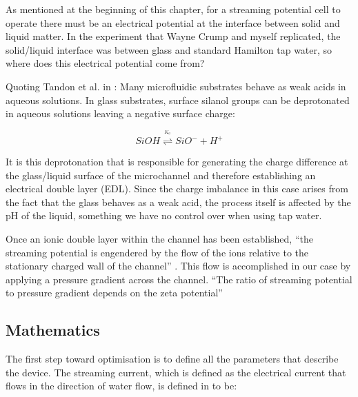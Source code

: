 As mentioned at the beginning of this chapter, for a streaming potential cell
to operate there must be an electrical potential at the interface between solid
and liquid matter. In the experiment that Wayne Crump and myself replicated,
the solid/liquid interface was between glass and standard Hamilton tap water,
so where does this electrical potential come from?

Quoting Tandon et al. in \cite{Tandon2008}: Many microfluidic substrates behave
as weak acids in aqueous solutions. In glass substrates, surface silanol groups
can be deprotonated in aqueous solutions leaving a negative surface charge:

\begin{equation}
    SiOH\overset{^{K_{a}}}{\mathbf{\rightleftharpoons}}SiO^{-}+H^{+}
\end{equation}


It is this deprotonation that is responsible for generating the charge
difference at the glass/liquid surface of the microchannel and therefore
establishing an electrical double layer (EDL). Since the charge imbalance in
this case arises from the fact that the glass behaves as a weak acid, the
process itself is affected by the pH of the liquid, something we have no
control over when using tap water.

Once an ionic double layer within the channel has been established, ``the
streaming potential is engendered by the flow of the ions relative to the
stationary charged wall of the channel'' \cite{Mansouri2005}.  This flow is
accomplished in our case by applying a pressure gradient across the channel.
``The ratio of streaming potential to pressure gradient depends on the zeta
potential''\cite{Park2009}


\subsection{\label{sub:StreamingCell-Mathematics}Mathematics}

The first step toward optimisation is to define all the parameters that
describe the device. The streaming current, which is defined as the electrical
current that flows in the direction of water flow, is defined in
\cite{Olthuis2005} to be:

